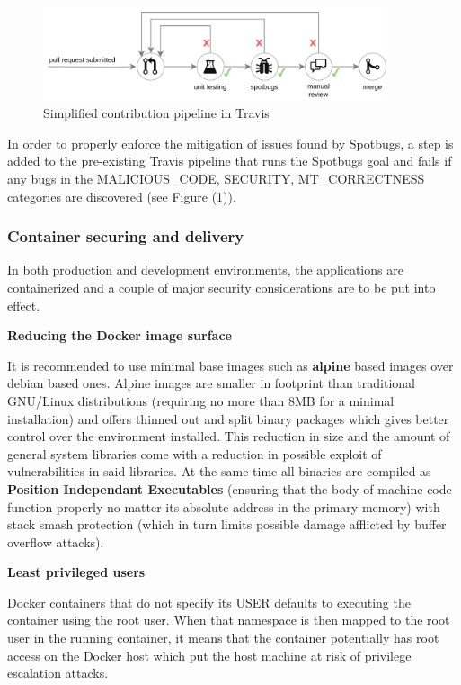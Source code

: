 \documentclass[11pt]{article}
\begin{document}
\begin{figure}[h]
    \centering
    \includegraphics[width=0.9\textwidth]{vulas_spotbugs.png}
    \caption{Simplified contribution pipeline in Travis}
    \label{fig:vulas_spotbugs}
\end{figure}

In order to properly enforce the mitigation of issues found by Spotbugs, a step is added to the pre-existing Travis pipeline that runs the Spotbugs goal and fails if any bugs in the MALICIOUS\_CODE, SECURITY, MT\_CORRECTNESS categories are discovered (see Figure (\ref{fig:vulas_spotbugs})). 

\vspace{3mm}
\subsubsection{Container securing and delivery}

\hspace{5mm} In both production and development environments, the applications are containerized and a couple of major security considerations are to be put into effect.

\textbf{Reducing the Docker image surface}

It is recommended to use minimal base images such as \textbf{alpine} based images over debian based ones. Alpine images are smaller in footprint than traditional GNU/Linux distributions (requiring no more than 8MB for a minimal installation) and offers thinned out and split binary packages which gives better control over the environment installed. This reduction in size and the amount of general system libraries come with a reduction in possible exploit of vulnerabilities in said libraries. At the same time all binaries are compiled as \textbf{Position Independant Executables} (ensuring that the body of machine code function properly no matter its absolute address in the primary memory) with stack smash protection (which in turn limits possible damage afflicted by buffer overflow attacks).

\textbf{Least privileged users}

Docker containers that do not specify its USER defaults to executing the container using the root user. When that namespace is then mapped to the root user in the running container, it means that the container potentially has root access on the Docker host which put the host machine at risk of privilege escalation attacks.
\end{document}
